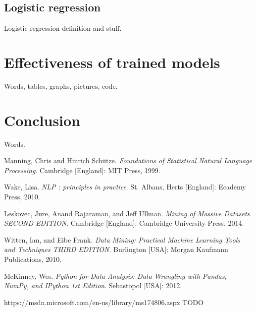 \documentclass[12pt]{report}
\begin{document}
\newpage

\section{Logistic regression}

Logistic regression definition and stuff.

\newpage

\chapter{Effectiveness of trained models}

Words, tables, graphs, pictures, code.

\newpage

\chapter*{Conclusion}

Words.

\newpage


\begin{thebibliography}{9}

 Manning, Chris and Hinrich Sch{\"u}tze. \textit{Foundations of Statistical Natural Language Processing}. Cambridge [England]: MIT Press, 1999.

 Wake, Lisa. \textit{NLP : principles in practice}. St. Albans, Herts [England]: Ecademy Press, 2010.

 Leskovec, Jure, Anand Rajaraman, and Jeff Ullman. \textit{Mining of Massive Datasets SECOND EDITION}. Cambridge [England]: Cambridge University Press, 2014.

 Witten, Ian, and Eibe Frank. \textit{Data Mining: Practical Machine Learning Tools and Techniques THIRD EDITION}. Burlington [USA]: Morgan Kaufmann Publications, 2010.

 McKinney, Wes. \textit{Python for Data Analysis: Data Wrangling with Pandas, NumPy, and IPython 1st Edition}. Sebastopol [USA]: 2012.

 https://msdn.microsoft.com/en-us/library/ms174806.aspx TODO

\end{thebibliography}
\end{document}
